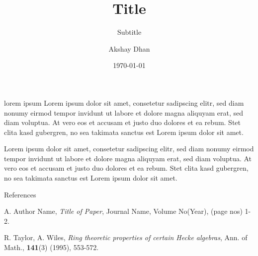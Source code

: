 \documentclass{beamer}
\author{Akshay Dhan}
\title{Title}
\subtitle{Subtitle}
\institute{Institute}
\date{\today}
\theoremstyle{definition}
\theoremstyle{remark}
\begin{document}
\frame{\titlepage}
\begin{frame}{lorem ipsum}
Lorem ipsum dolor sit amet, consetetur sadipscing elitr, sed diam nonumy eirmod
	tempor invidunt ut labore et dolore magna aliquyam erat, sed diam
	voluptua. At vero eos et accusam et justo duo dolores et ea rebum. Stet
	clita kasd gubergren, no sea takimata sanctus est Lorem ipsum dolor sit
	amet.
\end{frame}
\begin{frame}{}
	\begin{thm}[lorem]
Lorem ipsum dolor sit amet, consetetur sadipscing elitr, sed diam nonumy
		eirmod tempor invidunt ut labore et dolore magna aliquyam
		erat, sed diam voluptua. At vero eos et accusam et justo
		duo dolores et ea rebum. Stet clita kasd gubergren, no sea
		takimata sanctus est Lorem ipsum dolor sit amet.
\end{thm}
\end{frame}

\begin{frame}[t]{References}\vspace{10pt}
\begin{thebibliography}{abcd}
A. Author Name, 
{\it Title of Paper}, Journal Name, Volume No(Year), (page nos) 1-2.

R. Taylor, A. Wiles, {\it Ring theoretic properties of certain Hecke algebras}, Ann. of Math., \textbf{141}(3) (1995), 553-572.

\end{thebibliography}
\end{frame}
\end{document}
